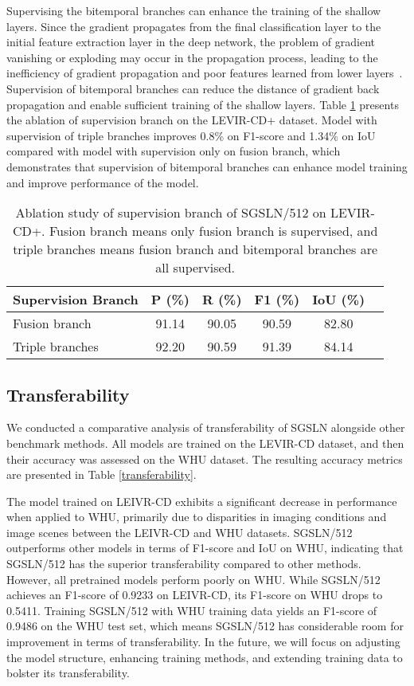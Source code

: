 \documentclass[journal]{IEEEtran}
\begin{document}
Supervising the bitemporal branches can enhance the training of the shallow layers. Since the gradient propagates from the final classification layer to the initial feature extraction layer in the deep network, the problem of gradient vanishing or exploding may occur in the propagation process, leading to the inefficiency of gradient propagation and poor features learned from lower layers~\cite{difficult_gradient_1,difficult_gradient_2,difficult_gradient_3,difficult_gradient_4,dsifn}. Supervision of bitemporal branches can reduce the distance of gradient back propagation and enable sufficient training of the shallow layers. Table \ref{supervision_ablation} presents the ablation of supervision branch on the LEVIR-CD+ dataset. Model with supervision of triple branches improves 0.8\% on F1-score and 1.34\% on IoU compared with model with supervision only on fusion branch, which demonstrates that supervision of bitemporal branches can enhance model training and improve performance of the model.

\begin{table}[!ht]
\caption{Ablation study of supervision branch of SGSLN/512 on LEVIR-CD+. Fusion branch means only fusion branch is supervised, and triple branches means fusion branch and bitemporal branches are all supervised.}
\label{supervision_ablation}
\centering
\begin{tabular}{lccccc} 
\toprule
Supervision Branch & P (\%) & R (\%) & F1 (\%) & IoU (\%) \\
\midrule
Fusion branch & 91.14 & 90.05 & 90.59 & 82.80 \\
Triple branches & 92.20 & 90.59 & 91.39 & 84.14 \\
\bottomrule
\end{tabular}
\end{table}

\subsection{Transferability}
We conducted a comparative analysis of transferability of SGSLN alongside other benchmark methods. All models are trained on the LEVIR-CD dataset, and then their accuracy was assessed on the WHU dataset. The resulting accuracy metrics are presented in Table \ref{transferability}.

The model trained on LEIVR-CD exhibits a significant decrease in performance when applied to WHU, primarily due to disparities in imaging conditions and image scenes between the LEIVR-CD and WHU datasets. SGSLN/512 outperforms other models in terms of F1-score and IoU on WHU, indicating that SGSLN/512 has the superior transferability compared to other methods. However, all pretrained models perform poorly on WHU. While SGSLN/512 achieves an F1-score of 0.9233 on LEIVR-CD, its F1-score on WHU drops to 0.5411. Training SGSLN/512 with WHU training data yields an F1-score of 0.9486 on the WHU test set, which means SGSLN/512 has considerable room for improvement in terms of transferability. In the future, we will focus on adjusting the model structure, enhancing training methods, and extending training data to bolster its transferability.
\end{document}
